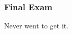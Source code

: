 \subsubsection{Final Exam}
\setcounter{exercise}{0}
\setcounter{equation}{0}

Never went to get it.
\begin{problem}
\end{problem}

\begin{problem}
\end{problem}

\begin{problem}
\end{problem}

\begin{problem}
\end{problem}

